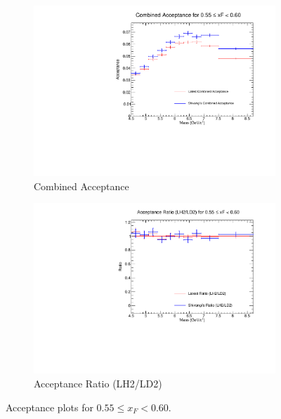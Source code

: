 \documentclass[11pt]{article}
\begin{document}
\begin{figure}[p]
\begin{subfigure}[b]{0.48\textwidth}
       \includegraphics[width=\linewidth]{./acceptancePlots/Combined_acceptance_xF_bin_11.pdf}
       \caption{Combined Acceptance}
    \end{subfigure}\hfill
    \begin{subfigure}[b]{0.48\textwidth}
       \includegraphics[width=\linewidth]{./acceptancePlots/Acceptance_ratio_xF_bin_11.pdf}
       \caption{Acceptance Ratio (LH2/LD2)}
    \end{subfigure}
    \caption{Acceptance plots for $0.55 \le x_F < 0.60$.}
\end{figure}
\end{document}

